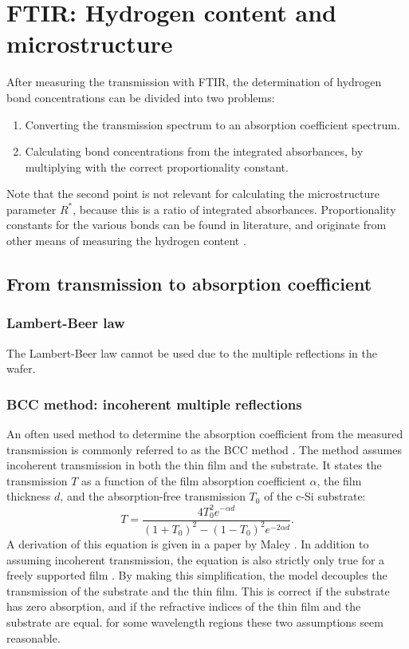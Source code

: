 \section{FTIR: Hydrogen content and microstructure}
After measuring the transmission with FTIR, the determination of hydrogen bond concentrations can be divided into two problems:
\begin{enumerate}
\item Converting the transmission spectrum to an absorption coefficient spectrum.
\item Calculating bond concentrations from the integrated absorbances, by multiplying with the correct proportionality constant.
\end{enumerate}
Note that the second point is not relevant for calculating the microstructure parameter $R^*$, because this is a ratio of integrated absorbances. Proportionality constants for the various bonds can be found in literature, and originate from other means of measuring the hydrogen content \cite{Langford1992}.
\subsection{From transmission to absorption coefficient}
\subsubsection{Lambert-Beer law}
The Lambert-Beer law cannot be used due to the multiple reflections in the wafer.
\subsubsection{BCC method: incoherent multiple reflections }
An often used method to determine the absorption coefficient from the measured transmission is commonly referred to as the BCC method \cite{Brodsky1977}. The method assumes incoherent transmission in both the thin film and the substrate. It states the transmission $T$ as a function of the film absorption coefficient $\alpha$, the film thickness $d$, and the absorption-free transmission $T_0$ of the c-Si substrate:
\begin{equation}
	T = \frac{4T_0^2 e^{-\alpha d}}{(1+T_0)^2 - (1-T_0)^2 e^{-2 \alpha d}}
.\end{equation}
A derivation of this equation is given in a paper by Maley \cite{Maley1992}. In addition to assuming incoherent transmission, the equation is also strictly only true for a freely supported film \cite{Brodsky1977}. By making this simplification, the model decouples the transmission of the substrate and the thin film. This is correct if the substrate has zero absorption, and if the refractive indices of the thin film and the substrate are equal. for some wavelength regions these two assumptions seem reasonable.

